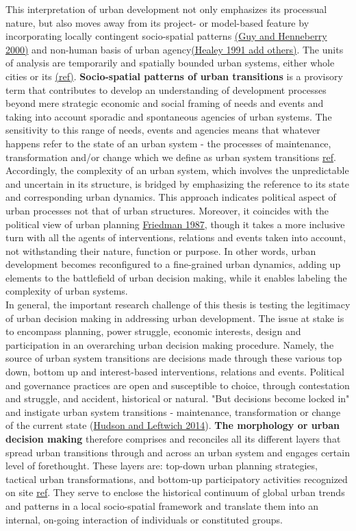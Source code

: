 \documentclass[11pt]{report}
\begin{document}
This interpretation of urban development not only emphasizes its processual nature, but also moves away from its project- or model-based feature by incorporating locally contingent socio-spatial patterns \href{ref}{(Guy and Henneberry 2000)} and non-human basis of urban agency\href{ref}{(Healey 1991 add others)}. The units of analysis are temporarily and spatially bounded urban systems, either whole cities or its  \href{ref}{(ref)}. \textbf{Socio-spatial patterns of urban transitions} is a provisory term  that contributes to develop an understanding of development processes beyond mere strategic economic and social framing of needs and events and taking into account sporadic and spontaneous agencies of urban systems. The sensitivity to this range of needs, events and agencies means that whatever happens refer to the state of an urban system - the processes of maintenance, transformation and/or change which we define as urban system transitions \href{ref}{ref}. Accordingly, the complexity of an urban system, which involves the unpredictable and uncertain in its structure, is bridged by emphasizing the reference to its state and corresponding urban dynamics. This approach indicates political aspect of urban processes not that of urban structures. Moreover, it coincides with the political view of urban planning \href{ref}{Friedman 1987}, though it takes a more inclusive turn with all the agents of interventions, relations and events taken into account, not withstanding their nature, function or purpose. In other words, urban development becomes reconfigured to a fine-grained urban dynamics, adding up elements to the battlefield of urban decision making, while it enables labeling the complexity of urban systems.
\\
In general, the important research challenge of this thesis is testing the legitimacy of urban decision making in addressing urban development. The issue at stake is to encompass planning, power struggle, economic interests, design and participation in an overarching urban decision making procedure. Namely, the source of urban system transitions are decisions made through these various top down, bottom up and interest-based interventions, relations and events. Political and governance practices are open and susceptible to choice, through contestation and struggle, and accident, historical or natural. "But decisions become locked in" and instigate urban system transitions - maintenance, transformation or change of the current state (\href{ref}{Hudson and Leftwich 2014}). \textbf{The morphology or urban decision making} therefore comprises and reconciles all its different layers that spread urban transitions through and across an urban system and engages certain level of forethought. These layers are: top-down urban planning strategies, tactical urban transformations, and bottom-up participatory activities recognized on site \href{ref}{ref}. They serve to enclose the historical continuum of global urban trends and patterns in a local socio-spatial framework and translate them into an internal, on-going interaction of individuals or constituted groups.
\end{document}
